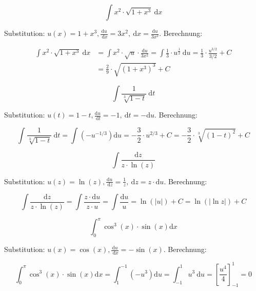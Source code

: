 \begin{example}

$$\int x^{2} \cdot \sqrt{1+x^{3}} \mathrm{~d} x$$

Substitution: $u(x)=1+x^{3}, \frac{\mathrm{d} u}{\mathrm{~d} x}=3 x^{2}, \mathrm{~d} x=\frac{\mathrm{d} u}{3 x^{2}}$. Berechnung:

$$
\begin{aligned}
\int x^{2} \cdot \sqrt{1+x^{3}} \mathrm{~d} x & =\int x^{2} \cdot \sqrt{u} \cdot \frac{\mathrm{d} u}{3 x^{2}}=\int \frac{1}{3} \cdot u^{\frac{1}{2}} \mathrm{~d} u=\frac{1}{3} \cdot \frac{u^{3 / 2}}{3 / 2}+C \\
& =\frac{2}{9} \cdot \sqrt{\left(1+x^{3}\right)^{3}}+C
\end{aligned}
$$

\end{example}

\begin{example}
    
$$\int \frac{1}{\sqrt[3]{1-t}} \mathrm{~d} t$$

Substitution: $u(t)=1-t, \frac{\mathrm{d} u}{\mathrm{~d} t}=-1, \mathrm{~d} t=-\mathrm{d} u$. Berechnung:

$$
\int \frac{1}{\sqrt[3]{1-t}} \mathrm{~d} t=\int\left(-u^{-1 / 3}\right) \mathrm{d} u=-\frac{3}{2} \cdot u^{2 / 3}+C=-\frac{3}{2} \cdot \sqrt[3]{(1-t)^{2}}+C
$$
\end{example}

\begin{example}
$$\int \frac{\mathrm{d} z}{z \cdot \ln (z)}$$

Substitution: $u(z)=\ln (z), \frac{\mathrm{d} u}{\mathrm{~d} z}=\frac{1}{z}, \mathrm{~d} z=z \cdot \mathrm{d} u$. Berechnung:

$$
\int \frac{\mathrm{d} z}{z \cdot \ln (z)}=\int \frac{z \cdot \mathrm{d} u}{z \cdot u}=\int \frac{\mathrm{d} u}{u}=\ln (|u|)+C=\ln (|\ln z|)+C
$$
\end{example}

\begin{example}
    
$$\int_{0}^{\pi} \cos ^{3}(x) \cdot \sin (x) \mathrm{d} x$$

Substitution: $u(x)=\cos (x), \frac{\mathrm{d} u}{\mathrm{~d} x}=-\sin (x)$. Berechnung:

$$
\int_{0}^{\pi} \cos ^{3}(x) \cdot \sin (x) \mathrm{d} x=\int_{1}^{-1}\left(-u^{3}\right) \mathrm{d} u=\int_{-1}^{1} u^{3} \mathrm{~d} u=\left[\frac{u^{4}}{4}\right]_{-1}^{1}=0
$$
\end{example}

